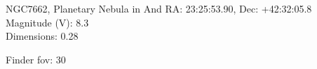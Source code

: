 \begin{block}{NGC7662, Planetary Nebula in And}
    RA: 23:25:53.90, Dec: +42:32:05.8 \\ 
    Magnitude (V): 8.3 \\ 
    Dimensions: 0.28 

    Finder fov: 30 
\end{block}